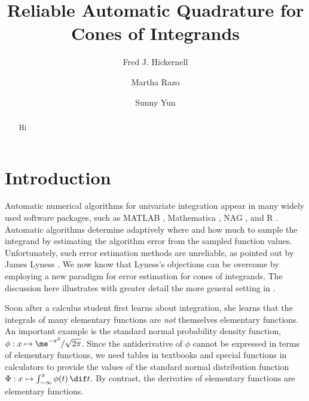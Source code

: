 \documentclass[]{amsart}
\theoremstyle{definition}
\theoremstyle{remark}
\begin{document}
\title{Reliable Automatic Quadrature for Cones of Integrands}
\author{Fred J. Hickernell}
\author{Martha Razo}
\author{Sunny Yun}
\maketitle 


\begin{abstract} Hi
\end{abstract}


\section{Introduction} 

Automatic numerical algorithms for univariate integration appear in many widely used software packages, such as MATLAB , Mathematica , NAG , and R .  Automatic algorithms determine adaptively where and how much to sample the integrand by estimating the algorithm error from the sampled function values.  Unfortunately, such error estimation methods are unreliable, as pointed out by James Lyness .
We now know that Lyness's objections can be overcome by employing a new paradigm for error estimation for cones of integrands.  The discussion here illustrates with greater detail the more general setting in .

Soon after a calculus student first learns about integration, she learns that the integrals of many elementary functions are \emph{not} themselves elementary functions.  An important example is the standard normal probability density function, $\phi: x \mapsto \me^{-x^2}/\sqrt{2 \pi}$.  Since the antiderivative of $\phi$ cannot be expressed in terms of elementary functions, we need tables in textbooks and special functions in calculators to provide the values of the standard normal distribution function $\Phi : x \mapsto \int_{-\infty}^x \phi(t) \, \dif t$. By contrast, the derivaties of elementary functions are elementary functions.  
\end{document}
